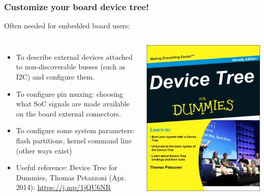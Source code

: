 \begin{frame}
  \frametitle{Customize your board device tree!}
  Often needed for embedded board users:
  \begin{columns}
       \begin{itemize}
       \item To describe external devices attached to non-discoverable
             busses (such as I2C) and configure them.
       \item To configure pin muxing: choosing what SoC signals are
	     made available on the board external connectors.
       \item To configure some system parameters: flash partitions,
	     kernel command line (other ways exist)
       \item Useful reference: Device Tree for Dummies, Thomas Petazzoni (Apr. 2014):
             \url{https://j.mp/1jQU6NR}
       \end{itemize}
    \includegraphics[height=0.6\textheight]{slides/sysdev-kernel-building/device-tree-for-dummies.png}
  \end{columns}
\end{frame}

